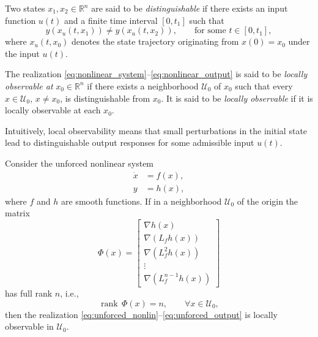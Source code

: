 \begin{definition}[Distinguishability]
Two states $x_1, x_2 \in \mathbb{R}^n$ are said to be \emph{distinguishable} if there exists
an input function $u(t)$ and a finite time interval $[0, t_1]$ such that
\begin{equation}
    y(x_u(t, x_1)) \neq y(x_u(t, x_2)), \qquad \text{for some } t \in [0, t_1],
\end{equation}
where $x_u(t, x_0)$ denotes the state trajectory originating from $x(0)=x_0$
under the input $u(t)$.
\end{definition}

\begin{definition}
The realization \eqref{eq:nonlinear_system}–\eqref{eq:nonlinear_output} 
is said to be \emph{locally observable at} $x_0 \in \mathbb{R}^n$ 
if there exists a neighborhood $\mathcal{U}_0$ of $x_0$ such that every
$x \in \mathcal{U}_0$, $x \neq x_0$, is distinguishable from $x_0$.
It is said to be \emph{locally observable} if it is locally observable at each $x_0$.
\end{definition}

Intuitively, local observability means that small perturbations in the initial state
lead to distinguishable output responses for some admissible input $u(t)$.

\begin{theorem}\label{thm:nonlinear_observability}
Consider the unforced nonlinear system
\begin{align}
    \dot{x} &= f(x), \label{eq:unforced_nonlin}\\
    y &= h(x), \label{eq:unforced_output}
\end{align}
where $f$ and $h$ are smooth functions.  
If in a neighborhood $\mathcal{U}_0$ of the origin the matrix
\begin{equation}
    \Phi(x) = 
    \begin{bmatrix}
        \nabla h(x)\\
        \nabla (L_f h(x))\\
        \nabla (L_f^2 h(x))\\
        \vdots\\
        \nabla (L_f^{n-1} h(x))
    \end{bmatrix}
\end{equation}
has full rank $n$, i.e.,
\begin{equation}
    \operatorname{rank}\, \Phi(x) = n, \qquad \forall x \in \mathcal{U}_0,
\end{equation}
then the realization \eqref{eq:unforced_nonlin}–\eqref{eq:unforced_output}
is locally observable in $\mathcal{U}_0$.
\end{theorem}

